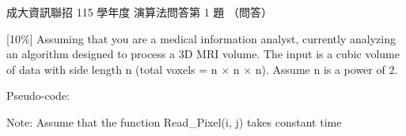 \begin{pastexam}[label={px:ncku-115-prog-14}]{成大資訊聯招 115 學年度 演算法問答第 1 題}
（問答）

[10\%] Assuming that you are a medical information analyst, currently analyzing an
algorithm designed to process a 3D MRI volume. The input is a cubic volume of data with
side length n (total voxels = n $\times$ n $\times$ n). Assume n is a power of 2.

Pseudo-code:
\begin{center}
\end{center}

Note: Assume that the function Read\_Pixel(i, j) takes constant time


\end{pastexam}
